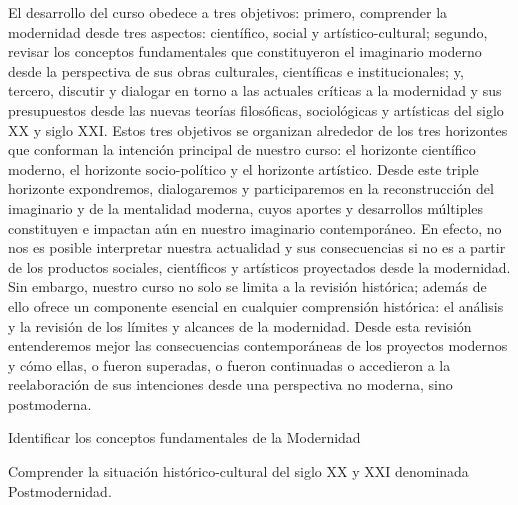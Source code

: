 \begin{syllabus}


\begin{justification}
El desarrollo del curso obedece a tres objetivos: primero, comprender la modernidad desde tres aspectos: científico, social y artístico-cultural; segundo, revisar los conceptos fundamentales que constituyeron el imaginario moderno desde la perspectiva de sus obras culturales, científicas e institucionales; y, tercero, discutir y dialogar en torno a las
actuales críticas a la modernidad y sus presupuestos desde las nuevas teorías filosóficas, sociológicas y artísticas del siglo XX y siglo XXI. Estos tres objetivos se organizan alrededor de los tres horizontes que conforman la intención principal de nuestro curso: el
horizonte científico moderno, el horizonte socio-político y el horizonte artístico. Desde este triple horizonte expondremos, dialogaremos y participaremos en la reconstrucción
del imaginario y de la mentalidad moderna, cuyos aportes y desarrollos múltiples constituyen e impactan aún en nuestro imaginario contemporáneo. En efecto, no nos es posible interpretar nuestra actualidad y sus consecuencias si no es a partir de los productos sociales, científicos y artísticos proyectados desde la modernidad. Sin embargo, nuestro curso no solo se limita a la revisión histórica; además de ello ofrece un
componente esencial en cualquier comprensión histórica: el análisis y la revisión de los límites y alcances de la modernidad. Desde esta revisión entenderemos mejor las
consecuencias contemporáneas de los proyectos modernos y cómo ellas, o fueron superadas, o fueron continuadas o accedieron a la reelaboración de sus intenciones desde una perspectiva no moderna, sino postmoderna.
\end{justification}

\begin{goals}
\item Identificar los conceptos fundamentales de la Modernidad
\item Comprender la situación histórico-cultural del siglo XX y XXI denominada Postmodernidad.
\end{goals}

\begin{outcomes}
    \item {} %
    \item {} %
    \item {} %
    \item {} %
    \item {} %
\end{outcomes}


\end{syllabus}
